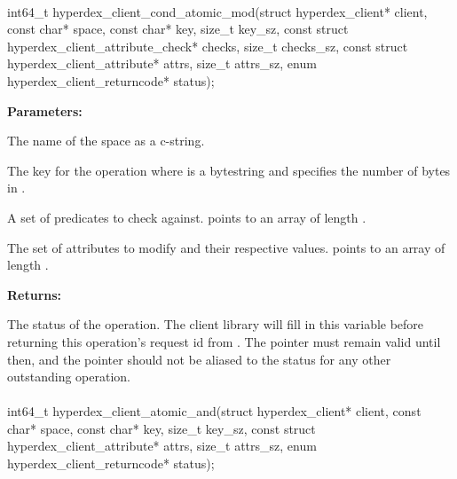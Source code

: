 \paragraph{}
\begin{ccode}
int64_t hyperdex_client_cond_atomic_mod(struct hyperdex_client* client,
                const char* space,
                const char* key, size_t key_sz,
                const struct hyperdex_client_attribute_check* checks, size_t checks_sz,
                const struct hyperdex_client_attribute* attrs, size_t attrs_sz,
                enum hyperdex_client_returncode* status);
\end{ccode}
\funcdesc 

\noindent\textbf{Parameters:}
\begin{description}[labelindent=\widthof{{\code{checks}, \code{checks\_sz}}},leftmargin=*,noitemsep,nolistsep,align=right]
\item[\code{space}] The name of the space as a c-string.
\item[\code{key}, \code{key\_sz}] The key for the operation where  is a bytestring and  specifies the number of bytes in .
\item[\code{checks}, \code{checks\_sz}] A set of predicates to check against.   points to an array of length .
\item[\code{attrs}, \code{attrs\_sz}] The set of attributes to modify and their respective values.   points to an array of length .
\end{description}

\noindent\textbf{Returns:}
\begin{description}[labelindent=\widthof{{\code{status}}},leftmargin=*,noitemsep,nolistsep,align=right]
\item[\code{status}] The status of the operation.  The client library will fill in this variable before returning this operation's request id from .  The pointer must remain valid until then, and the pointer should not be aliased to the status for any other outstanding operation.
\end{description}

\paragraph{}
\begin{ccode}
int64_t hyperdex_client_atomic_and(struct hyperdex_client* client,
                const char* space,
                const char* key, size_t key_sz,
                const struct hyperdex_client_attribute* attrs, size_t attrs_sz,
                enum hyperdex_client_returncode* status);
\end{ccode}
\funcdesc 

